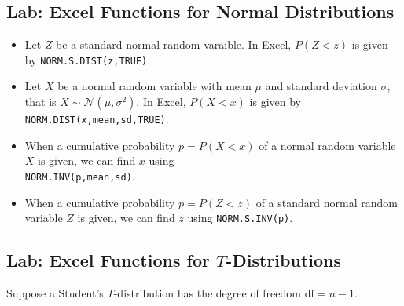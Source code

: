 \vspace*{6\baselineskip}

\hypertarget{lab-excel-functions-for-normal-distributions}{%
\subsection{Lab: Excel Functions for Normal
Distributions}\label{lab-excel-functions-for-normal-distributions}}

\begin{itemize}
\item
  Let \(Z\) be a standard normal random varaible. In Excel, \(P(Z<z)\)
  is given by \texttt{NORM.S.DIST(z,TRUE)}.
\item
  Let \(X\) be a normal random variable with mean \(\mu\) and standard
  deviation \(\sigma\), that is \(X\sim \mathcal{N}(\mu, \sigma^2)\). In
  Excel, \(P(X<x)\) is given by \texttt{NORM.DIST(x,mean,sd,TRUE)}.
\item
  When a cumulative probability \(p=P(X<x)\) of a normal random variable
  \(X\) is given, we can find \(x\) using\\ \texttt{NORM.INV(p,mean,sd)}.
\item
  When a cumulative probability \(p=P(Z<z)\) of a standard normal random
  variable \(Z\) is given, we can find \(z\) using
  \texttt{NORM.S.INV(p)}.
\end{itemize}

\hypertarget{lab-excel-functions-for-t-distributions}{%
\subsection{\texorpdfstring{Lab: Excel Functions for
\(T\)-Distributions}{Lab: Excel Functions for T-Distributions}}\label{lab-excel-functions-for-t-distributions}}

Suppose a Student's \(T\)-distribution has the degree of freedom
\(\text{df}=n-1\).


